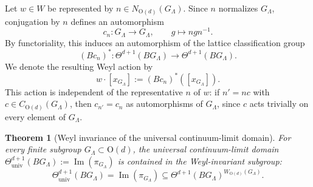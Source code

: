 \documentclass[aps,prx,reprint,superscriptaddress,twocolumn,amsmath,amssymb,amsfonts, nofootinbib]{revtex4-2}
\theoremstyle{apsstyle}
\newtheorem{theorem}{Theorem}[section]
\begin{document}
\medskip 

\noindent Let $w\in W$ be represented by $n\in N_{\mathrm{O}(d)}(G_{\Lambda})$. Since $n$ normalizes $G_{\Lambda}$, conjugation by $n$ defines an automorphism
\begin{equation*}
c_n:G_{\Lambda}\longrightarrow G_{\Lambda},
\qquad g\longmapsto ngn^{-1}.
\end{equation*}
By functoriality, this induces an automorphism of the lattice classification group
\begin{equation*}
(Bc_n)^{*}: \Theta^{d+1}(BG_{\Lambda})
\longrightarrow \Theta^{d+1}(BG_{\Lambda}).
\end{equation*}
We denote the resulting Weyl action by
\begin{equation*}
w\cdot [x_{G_{\Lambda}}] := (Bc_n)^{*}([x_{G_{\Lambda}}]).
\end{equation*}
This action is independent of the representative $n$ of $w$: if $n'=nc$ with $c\in C_{\mathrm{O}(d)}(G_{\Lambda})$, then $c_{n'}=c_n$ as
automorphisms of $G_{\Lambda}$, since $c$ acts trivially on every
element of $G_{\Lambda}$.

\bigskip 

\begin{theorem}[Weyl invariance of the universal continuum-limit domain] \label{thm:universal_domain_weyl_invariant} 
For every finite subgroup $G_{\Lambda}\subset \mathrm{O}(d)$, the universal continuum-limit domain $\Theta^{d+1}_{\mathrm{univ}}(BG_{\Lambda}) := \operatorname{Im}(\pi_{G_{\Lambda}})$ is contained in the Weyl-invariant subgroup: 
\begin{equation} 
\Theta^{d+1}_{\mathrm{univ}}(BG_{\Lambda}) = \operatorname{Im}(\pi_{G_{\Lambda}}) \subseteq \Theta^{d+1}(BG_{\Lambda})^{W_{\mathrm{O}(d)}(G_{\Lambda})}. \label{eq:universal_domain_weyl_invariant} 
\end{equation} 
\end{theorem}
\end{document}
